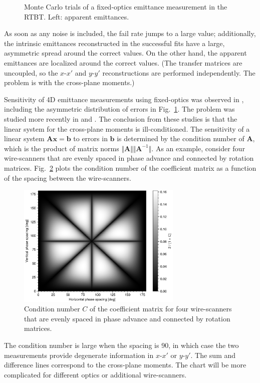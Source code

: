 \begin{figure}[!p]
\begin{subfigure}{1.0\textwidth}
    \end{subfigure}
    \caption{Monte Carlo trials of a fixed-optics emittance measurement in the RTBT. Left: apparent emittances.}
    \label{fig:prod_sensitivity}
\end{figure}
%
As soon as any noise is included, the fail rate jumps to a large value; additionally, the intrinsic emittances reconstructed in the successful fits have a large, asymmetric spread around the correct values. On the other hand, the apparent emittances are localized around the correct values. (The transfer matrices are uncoupled, so the $x$-$x'$ and $y$-$y'$ reconstructions are performed independently. The problem is with the cross-plane moments.)

Sensitivity of 4D emittance measurements using fixed-optics was observed in \cite{Woodley2000}, including the asymmetric distribution of errors in Fig.~\ref{fig:prod_sensitivity}. The problem was studied more recently in \cite{Agapov2007} and \cite{Faus-Golfe2016}. The conclusion from these studies is that the linear system for the cross-plane moments is ill-conditioned. The sensitivity of a linear system $\mathbf{A} \mathbf{x} = \mathbf{b}$ to errors in $\mathbf{b}$ is determined by the condition number of $\mathbf{A}$, which is the product of matrix norms $\Vert \mathbf{A} \Vert \Vert \mathbf{A}^{-1} \Vert$. As an example, consider four wire-scanners that are evenly spaced in phase advance and connected by rotation matrices. Fig.~\ref{fig:fodo_condition_number} plots the condition number of the coefficient matrix as a function of the spacing between the wire-scanners.
%
\begin{figure}[!p]
    \centering
    \includegraphics[width=0.7\textwidth]{Images/chapter4/fodo_condition_number.png}
    \caption{Condition number $C$ of the coefficient matrix for four wire-scanners that are evenly spaced in phase advance and connected by rotation matrices.}
    \label{fig:fodo_condition_number}
\end{figure}
%
The condition number is large when the spacing is 90\degree, in which case the two measurements provide degenerate information in $x$-$x'$ or $y$-$y'$. The sum and difference lines correspond to the cross-plane moments. The chart will be more complicated for different optics or additional wire-scanners.

